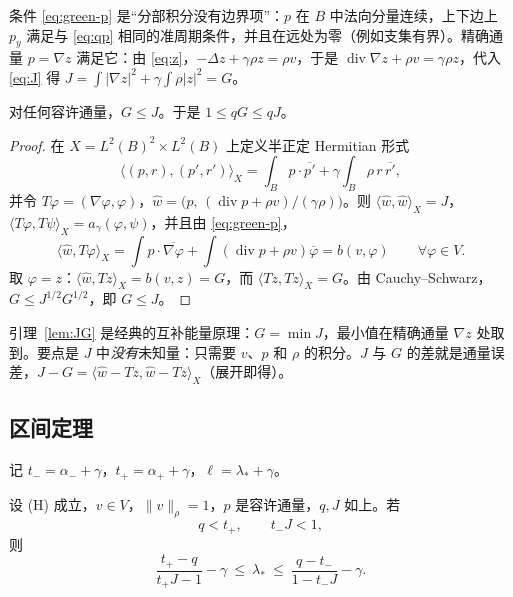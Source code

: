 \documentclass[11pt,a4paper,fontset=fandol]{ctexart}
\begin{document}
条件 \eqref{eq:green-p} 是“分部积分没有边界项”：$p$ 在 $B$ 中法向分量连续，上下边上 $p_y$ 满足与 \eqref{eq:qp} 相同的准周期条件，并且在远处为零（例如支集有界）。精确通量 $p=\nabla z$ 满足它：由 \eqref{eq:z}，$-\Delta z+\gamma\rho z=\rho v$，于是 $\operatorname{div}\nabla z+\rho v=\gamma\rho z$，代入 \eqref{eq:J} 得 $J=\int|\nabla z|^2+\gamma\int\rho|z|^2=G$。

\begin{lemma}[$J$ 是 $G$ 的上界]
\label{lem:JG}
对任何容许通量，$G\le J$。于是 $1\le qG\le qJ$。
\end{lemma}

\begin{proof}
在 $X=L^2(B)^2\times L^2(B)$ 上定义半正定 Hermitian 形式
\[
\langle(p,r),(p',r')\rangle_X=\int_Bp\cdot\overline{p'}+\gamma\int_B\rho\,r\,\overline{r'} ,
\]
并令 $T\varphi=(\nabla\varphi,\varphi)$，$\hat w=\bigl(p,\,(\operatorname{div}p+\rho v)/(\gamma\rho)\bigr)$。则 $\langle\hat w,\hat w\rangle_X=J$，$\langle T\varphi,T\psi\rangle_X=a_\gamma(\varphi,\psi)$，并且由 \eqref{eq:green-p}，
\[
\langle\hat w,T\varphi\rangle_X=\int p\cdot\overline{\nabla\varphi}+\int(\operatorname{div}p+\rho v)\overline\varphi=b(v,\varphi)\qquad\forall\varphi\in V .
\]
取 $\varphi=z$：$\langle\hat w,Tz\rangle_X=b(v,z)=G$，而 $\langle Tz,Tz\rangle_X=G$。由 Cauchy--Schwarz，$G\le J^{1/2}G^{1/2}$，即 $G\le J$。
\end{proof}

\begin{remark}
引理~\ref{lem:JG} 是经典的互补能量原理：$G=\min J$，最小值在精确通量 $\nabla z$ 处取到。要点是 $J$ 中\emph{没有}未知量：只需要 $v$、$p$ 和 $\rho$ 的积分。$J$ 与 $G$ 的差就是通量误差，$J-G=\langle\hat w-Tz,\hat w-Tz\rangle_X$（展开即得）。
\end{remark}

\subsection{区间定理}

记 $t_-=\alpha_-+\gamma$，$t_+=\alpha_++\gamma$，$\ell=\lambda_*+\gamma$。

\begin{theorem}[Lehmann--Goerisch 区间，$N=1$]
\label{thm:goerisch}
设 (H) 成立，$v\in V$，$\|v\|_\rho=1$，$p$ 是容许通量，$q,J$ 如上。若
\begin{equation}
\label{eq:goerisch-cond}
q<t_+,\qquad t_-J<1 ,
\end{equation}
则
\begin{equation}
\label{eq:goerisch-interval}
\frac{t_+-q}{t_+J-1}-\gamma\ \le\ \lambda_*\ \le\ \frac{q-t_-}{1-t_-J}-\gamma .
\end{equation}
\end{theorem}
\end{document}

